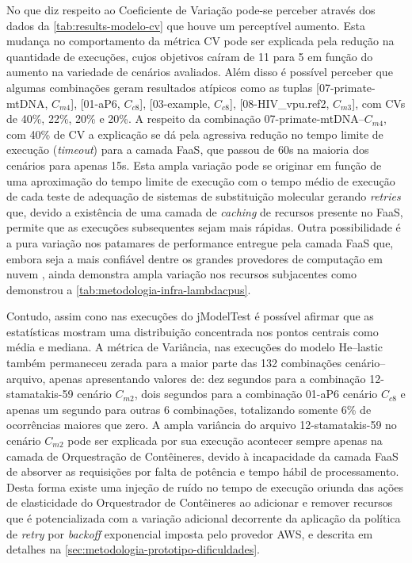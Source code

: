 \documentclass[english,brazilian]{UNISINOSmonografia} %
\begin{document}
No que diz respeito ao Coeficiente de Variação pode-se perceber através dos dados da \autoref{tab:results-modelo-cv} que houve um perceptível aumento.
%
Esta mudança no comportamento da métrica CV pode ser explicada pela redução na quantidade de execuções, cujos objetivos caíram de 11 para 5 em função do aumento na variedade de cenários avaliados.
%
Além disso é possível perceber que algumas combinações geram resultados atípicos como as tuplas [07-primate-mtDNA, $C_{m4}$], [01-aP6, $C_{c8}$], [03-example, $C_{c8}$], [08-HIV\_vpu.ref2, $C_{m3}$], com CVs de 40\%, 22\%, 20\% e 20\%.
%
A respeito da combinação 07-primate-mtDNA--$C_{m4}$, com 40\% de CV a explicação se dá pela agressiva redução no tempo limite de execução (\textit{timeout}) para a camada FaaS, que passou de 60s na maioria dos cenários para apenas 15s.
%
Esta ampla variação pode se originar em função de uma aproximação do tempo limite de execução com o tempo médio de execução de cada teste de adequação de sistemas de substituição molecular gerando \textit{retries} que, devido a existência de uma camada de \textit{caching} de recursos presente no FaaS, permite que as execuções subsequentes sejam mais rápidas.
%
Outra possibilidade é a pura variação nos patamares de performance entregue pela camada FaaS que, embora seja a mais confiável dentre os grandes provedores de computação em nuvem \cite{Wang2018}, ainda demonstra ampla variação nos recursos subjacentes como demonstrou a \autoref{tab:metodologia-infra-lambdacpus}.



Contudo, assim cono nas execuções do jModelTest é possível afirmar que as estatísticas mostram uma distribuição concentrada nos pontos centrais como média e mediana.
%
A métrica de Variância, nas execuções do modelo \textsf{He}--lastic também permaneceu zerada para a maior parte das 132 combinações cenário--arquivo, apenas apresentando valores de: dez segundos para a combinação 12-stamatakis-59 cenário $C_{m2}$, dois segundos para a combinação 01-aP6 cenário $C_{c8}$ e apenas um segundo para outras 6 combinações, totalizando somente 6\% de ocorrências maiores que zero.
%
A ampla variância do arquivo 12-stamatakis-59 no cenário $C_{m2}$ pode ser explicada por sua execução acontecer sempre apenas na camada de Orquestração de Contêineres, devido à incapacidade da camada FaaS de absorver as requisições por falta de potência e tempo hábil de processamento.
%
Desta forma existe uma injeção de ruído no tempo de execução oriunda das ações de elasticidade do Orquestrador de Contêineres ao adicionar e remover recursos que é potencializada com a variação adicional decorrente da aplicação da política de \textit{retry} por \textit{backoff} exponencial imposta pelo provedor AWS, e descrita em detalhes na \autoref{sec:metodologia-prototipo-dificuldades}. 
\end{document}

